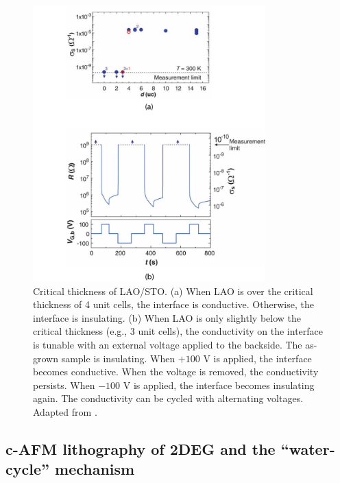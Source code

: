 \documentclass[pdflatex, sectionletters, 12pt]{pittetd}    %
\begin{document}
\begin{figure}[p]
	\centering
	\includegraphics[width=0.8\textwidth]{Drawing/CriticalThickness.pdf}
	\caption{Critical thickness of LAO/STO. (a) When LAO is over the critical thickness of 4 unit cells, the interface is conductive. Otherwise, the interface is insulating. (b) When LAO is only slightly below the critical thickness (e.g., 3 unit cells), the conductivity on the interface is tunable with an external voltage applied to the backside. The as-grown sample is insulating. When $+100$ V is applied, the interface becomes conductive. When the voltage is removed, the conductivity persists. When $-100$ V is applied, the interface becomes insulating again. The conductivity can be cycled with alternating voltages. Adapted from \cite{thiel2006tunable}.}
	\label{FIG:CriticalThickness}
\end{figure}

\subsection{c-AFM lithography of 2DEG and the ``water-cycle'' mechanism}
\label{SEC:WaterCycle}
\end{document}
